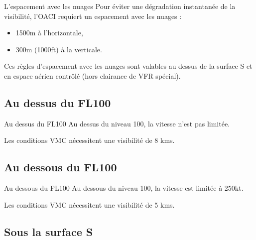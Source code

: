\documentclass{beamer}
\begin{document}
\begin{frame}{L'espacement avec les nuages}
  Pour éviter une dégradation instantanée de la visibilité, l'OACI
  requiert un espacement avec les nuages :

  \begin{itemize}
    \item 1500m à l'horizontale, \pause
    \item 300m (1000ft) à la verticale.
  \end{itemize}

  Ces règles d'espacement avec les nuages sont valables au dessus de
  la surface S et en espace aérien contrôlé (hors clairance de VFR
  spécial).
  
\end{frame}


\subsection{Au dessus du FL100}

\begin{frame}{Au dessus du FL100}
  Au dessus du niveau 100, la vitesse n'est pas limitée.

  Les conditions VMC nécessitent une visibilité de 8 kms.
\end{frame}

\subsection{Au dessous du FL100}

\begin{frame}{Au dessous du FL100}
  Au dessous du niveau 100, la vitesse est limitée à 250kt.

  Les conditions VMC nécessitent une visibilité de 5 kms.
\end{frame}


\subsection{Sous la surface S}
\end{document}
